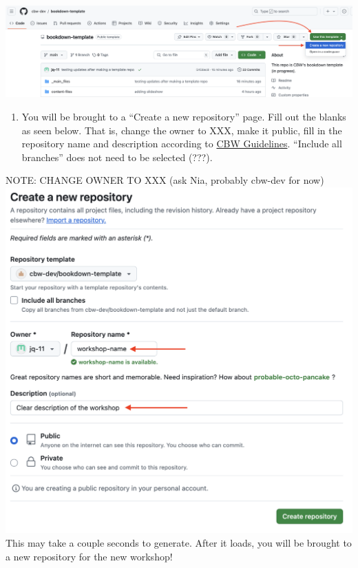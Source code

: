 \documentclass[
]{book}
\providecommand{\tightlist}{%
  \setlength{\itemsep}{0pt}\setlength{\parskip}{0pt}}
\theoremstyle{definition}
\theoremstyle{definition}
\theoremstyle{definition}
\theoremstyle{definition}
\theoremstyle{remark}
\begin{document}
\includegraphics{img/template/make-a-template.png}\\

\begin{enumerate}
\def\labelenumi{\arabic{enumi}.}
\setcounter{enumi}{2}
\tightlist
\item
  You will be brought to a ``Create a new repository'' page. Fill out the blanks as seen below. That is, change the owner to XXX, make it public, fill in the repository name and description according to \href{}{CBW Guidelines}. ``Include all branches'' does not need to be selected (???).
\end{enumerate}

NOTE: CHANGE OWNER TO XXX (ask Nia, probably cbw-dev for now)
\includegraphics{img/template/make-new-repo.png}\\

This may take a couple seconds to generate. After it loads, you will be brought to a new repository for the new workshop!
\end{document}
